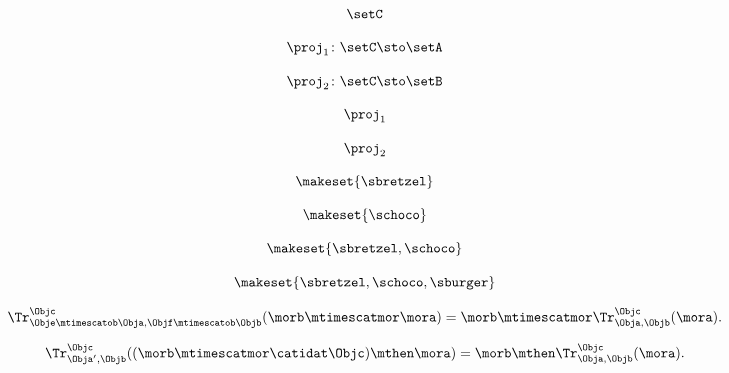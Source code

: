 \begin{forslides}
    \begin{equation}
        \label{eq:feedback-151}
        \setC
    \end{equation}

    \begin{equation}
        \label{eq:feedback-152}
        \proj_1\colon \setC \sto \setA
    \end{equation}

    \begin{equation}
        \label{eq:feedback-153}
        \proj_2\colon \setC \sto \setB
    \end{equation}

    \begin{equation}
        \label{eq:feedback-154}
        \proj_1
    \end{equation}

    \begin{equation}
        \label{eq:feedback-155}
        \proj_2
    \end{equation}

    \begin{equation}
        \label{eq:feedback-156}
        \makeset{ \sbretzel }
    \end{equation}

    \begin{equation}
        \label{eq:feedback-157}
        \makeset{ \schoco }
    \end{equation}

    \begin{equation}
        \label{eq:feedback-158}
        \makeset{ \sbretzel, \schoco }
    \end{equation}

    \begin{equation}
        \label{eq:feedback-159}
        \makeset{ \sbretzel, \schoco, \sburger }
    \end{equation}

    \begin{equation}
        \label{eq:feedback-160}
                      \Tr_{\Obje\mtimescatob \Obja,\Objf\mtimescatob \Objb}^{\Objc}(\morb \mtimescatmor \mora)=\morb \mtimescatmor \Tr_{\Obja,\Objb}^\Objc(\mora).
    \end{equation}

    \begin{equation}
        \label{eq:feedback-161}
        \Tr_{\Obja', \Objb}^\Objc ( (\morb \mtimescatmor \catidat\Objc) \mthen \mora) = \morb \mthen \Tr_{\Obja, \Objb}^\Objc (\mora).
    \end{equation}


\end{forslides}
